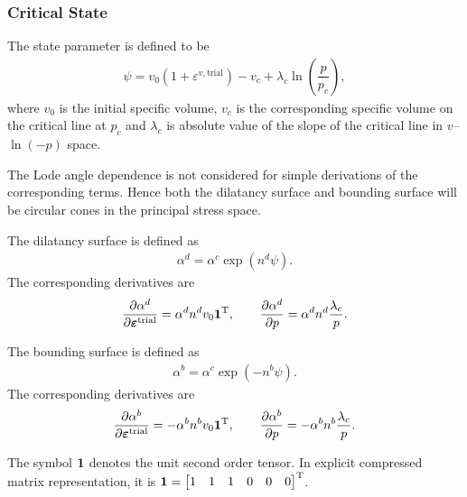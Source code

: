 \subsubsection{Critical State}
The state parameter is defined to be
\begin{gather*}
\psi=v_0\left(1+\varepsilon^{v,\text{trial}}\right)-v_c+\lambda_c\ln\left(\dfrac{p}{p_c}\right),
\end{gather*}
where $v_0$ is the initial specific volume, $v_c$ is the corresponding specific volume on the critical line at $p_c$ and $\lambda_c$ is absolute value of the slope of the critical line in $v$--$\ln(-p)$ space.

The Lode angle dependence is not considered for simple derivations of the corresponding terms. Hence both the dilatancy surface and bounding surface will be circular cones in the principal stress space.

The dilatancy surface is defined as
\begin{gather*}
\alpha^d=\alpha^c\exp\left(n^d\psi\right).
\end{gather*}
The corresponding derivatives are
\begin{gather*}
\dfrac{\partial{\alpha^d}}{\partial{\bm{\varepsilon}^\text{trial}}}=\alpha^dn^dv_0\bm{1}^{\mathrm{T}},\qquad
\dfrac{\partial{\alpha^d}}{\partial{p}}=\alpha^dn^d\dfrac{\lambda_c}{p}.
\end{gather*}

The bounding surface is defined as
\begin{gather*}
\alpha^b=\alpha^c\exp\left(-n^b\psi\right).
\end{gather*}
The corresponding derivatives are
\begin{gather*}
\dfrac{\partial{\alpha^b}}{\partial{\bm{\varepsilon}^\text{trial}}}=-\alpha^bn^bv_0\bm{1}^{\mathrm{T}},\qquad
\dfrac{\partial{\alpha^b}}{\partial{p}}=-\alpha^bn^b\dfrac{\lambda_c}{p}.
\end{gather*}

The symbol $\bm{1}$ denotes the unit second order tensor. In explicit compressed matrix representation, it is $\bm{1}=\begin{bmatrix}
1&1&1&0&0&0
\end{bmatrix}^{\mathrm{T}}$.

